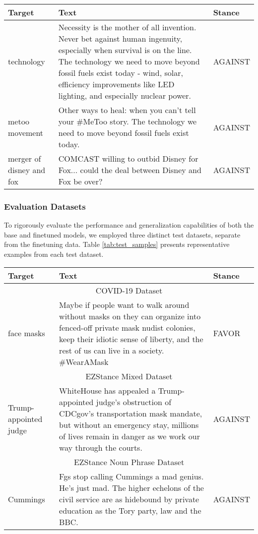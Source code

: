 \documentclass[twocolumn,11pt,letterpaper]{article}
\begin{document}
\begin{table*}[!htbp]
\centering
\caption{Sample Training Data Points}
\label{tab:training_samples}
\begin{tabular}{|p{}|p{}|p{}|}
\hline
\textbf{Target} & \textbf{Text} & \textbf{Stance} \\
\hline
technology & Necessity is the mother of all invention. Never bet against human ingenuity, especially when survival is on the line. The technology we need to move beyond fossil fuels exist today - wind, solar, efficiency improvements like LED lighting, and especially nuclear power. & AGAINST \\
\hline
metoo movement & Other ways to heal: when you can't tell your \#MeToo story. The technology we need to move beyond fossil fuels exist today. & AGAINST \\
\hline
merger of disney and fox & COMCAST willing to outbid Disney for Fox... could the deal between Disney and Fox be over? & AGAINST \\
\hline
\end{tabular}
\end{table*}

\subsubsection{Evaluation Datasets}
To rigorously evaluate the performance and generalization capabilities of both the base and finetuned models, we employed three distinct test datasets, separate from the finetuning data. Table \ref{tab:test_samples} presents representative examples from each test dataset.

\begin{table*}[!htbp]
\centering
\caption{Sample Test Data Points from Different Evaluation Datasets}
\label{tab:test_samples}
\begin{tabular}{|p{}|p{}|p{}|}
\hline
\textbf{Target} & \textbf{Text} & \textbf{Stance} \\
\hline
\multicolumn{3}{|c|}{COVID-19 Dataset} \\
\hline
face masks & Maybe if people want to walk around without masks on they can organize into fenced-off private mask nudist colonies, keep their idiotic sense of liberty, and the rest of us can live in a society. \#WearAMask & FAVOR \\
\hline
\multicolumn{3}{|c|}{EZStance Mixed Dataset} \\
\hline
Trump-appointed judge & WhiteHouse has appealed a Trump-appointed judge's obstruction of CDCgov's transportation mask mandate, but without an emergency stay, millions of lives remain in danger as we work our way through the courts. & AGAINST \\
\hline
\multicolumn{3}{|c|}{EZStance Noun Phrase Dataset} \\
\hline
Cummings & Fgs stop calling Cummings a mad genius. He's just mad. The higher echelons of the civil service are as hidebound by private education as the Tory party, law and the BBC. & AGAINST \\
\hline
\end{tabular}
\end{table*}
\end{document}
